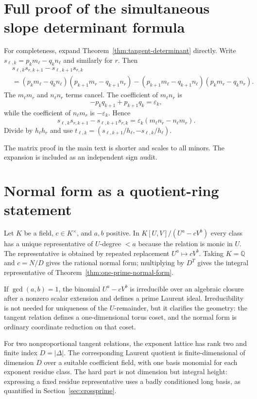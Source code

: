 \documentclass[11pt,oneside]{article}
\theoremstyle{definition}
\theoremstyle{remark}
\newcommand{\Q}{\mathbb Q}
\newcommand{\eps}{\varepsilon}
\begin{document}
\section{Full proof of the simultaneous slope determinant formula}
\label{app:detproof}

For completeness, expand Theorem~\ref{thm:tangent-determinant} directly.  Write
$s_{\ell,k}=p_km_\ell-q_kn_\ell$ and similarly for $r$.  Then
\begin{align*}
&s_{\ell,k}s_{r,k+1}-s_{\ell,k+1}s_{r,k}\\
&=(p_km_\ell-q_kn_\ell)(p_{k+1}m_r-q_{k+1}n_r)
 -(p_{k+1}m_\ell-q_{k+1}n_\ell)(p_km_r-q_kn_r).
\end{align*}
The $m_\ell m_r$ and $n_\ell n_r$ terms cancel.  The coefficient of $m_\ell n_r$ is
\[
 -p_kq_{k+1}+p_{k+1}q_k=\eps_k,
\]
while the coefficient of $n_\ell m_r$ is $-\eps_k$.  Hence
\[
 s_{\ell,k}s_{r,k+1}-s_{\ell,k+1}s_{r,k}
 =\eps_k(m_\ell n_r-n_\ell m_r).
\]
Divide by $h_\ell h_r$ and use
$t_{\ell,k}=(s_{\ell,k+1}/h_\ell,-s_{\ell,k}/h_\ell)$.

The matrix proof in the main text is shorter and scales to all minors.  The expansion is
included as an independent sign audit.

\section{Normal form as a quotient-ring statement}
\label{app:quotient}

Let $K$ be a field, $c\in K^\times$, and $a,b$ positive.  In
$K[U,V]/(U^a-cV^b)$ every class has a unique representative of $U$-degree $<a$ because the
relation is monic in $U$.  The representative is obtained by repeated replacement
$U^a\mapsto cV^b$.  Taking $K=\Q$ and $c=N/D$ gives the rational normal form; multiplying by
$D^T$ gives the integral representative of Theorem~\ref{thm:one-prime-normal-form}.

If $\gcd(a,b)=1$, the binomial $U^a-cV^b$ is irreducible over an algebraic closure after a
nonzero scalar extension and defines a prime Laurent ideal.  Irreducibility is not needed for
uniqueness of the $U$-remainder, but it clarifies the geometry: the tangent relation defines a
one-dimensional torus coset, and the normal form is ordinary coordinate reduction on that
coset.

For two nonproportional tangent relations, the exponent lattice has rank two and finite index
$D=|\Delta|$.  The corresponding Laurent quotient is finite-dimensional of dimension $D$
over a suitable coefficient field, with one basis monomial for each exponent residue class.
The hard part is not dimension but integral height: expressing a fixed residue representative
uses a badly conditioned long basis, as quantified in Section~\ref{sec:crossprime}.
\end{document}
